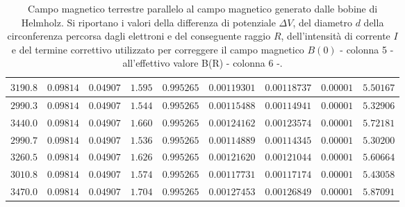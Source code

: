 \documentclass[]{article}
\begin{document}
\begin{table}
\begin{tabular}{||c|c|c|c|c|c|c|c|c||}
    $3190.8$ & $0.09814$ & $0.04907$ & $1.595$ & $0.995265$ & $0.00119301$ & $0.00118737$ & $0.00001$ & $5.50167$ \\\hline
    $2990.3$ & $0.09814$ & $0.04907$ & $1.544$ & $0.995265$ & $0.00115488$ & $0.00114941$ & $0.00001$ & $5.32906$ \\\hline
    $3440.0$ & $0.09814$ & $0.04907$ & $1.660$ & $0.995265$ & $0.00124162$ & $0.00123574$ & $0.00001$ & $5.72181$ \\\hline
    $2990.7$ & $0.09814$ & $0.04907$ & $1.536$ & $0.995265$ & $0.00114889$ & $0.00114345$ & $0.00001$ & $5.30200$ \\\hline
    $3260.5$ & $0.09814$ & $0.04907$ & $1.626$ & $0.995265$ & $0.00121620$ & $0.00121044$ & $0.00001$ & $5.60664$ \\\hline
    $3010.8$ & $0.09814$ & $0.04907$ & $1.574$ & $0.995265$ & $0.00117731$ & $0.00117174$ & $0.00001$ & $5.43058$ \\\hline
    $3470.0$ & $0.09814$ & $0.04907$ & $1.704$ & $0.995265$ & $0.00127453$ & $0.00126849$ & $0.00001$ & $5.87091$ \\\hline

\end{tabular}
    \caption{Campo magnetico terrestre parallelo al campo magnetico generato dalle bobine di Helmholz. Si riportano i valori della differenza di potenziale $\Delta V$, del diametro $ d $ della circonferenza percorsa dagli elettroni e del conseguente raggio $ R $, dell'intensità di corrente $ I $ e del termine correttivo utilizzato per correggere il campo magnetico $B(0)$ - colonna 5 - all'effettivo valore B(R) - colonna 6 -.}
    \label{CM_parallelo}
\end{table}
\end{document}
